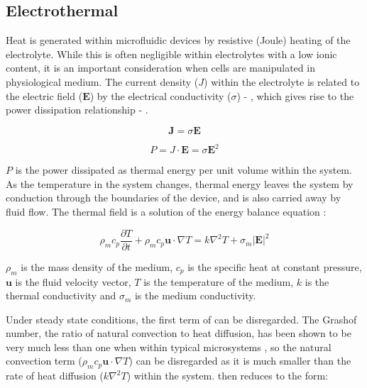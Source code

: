 \subsection{Electrothermal}

Heat is generated within microfluidic devices by resistive (Joule) heating of the electrolyte. While this is often negligible within electrolytes with a low ionic content, it is an important consideration when cells are manipulated in physiological medium. The current density ($J$) within the electrolyte is related to the electric field ($\textbf{E}$) by the electrical conductivity ($\sigma$) - , which gives rise to the power dissipation relationship - .

\begin{equation}
\textbf{J} = \sigma \textbf{E}
 \label{eqn:current_density}
\end{equation} 

\begin{equation}
P = J \cdot \textbf{E} = \sigma \textbf{E}^{2}
 \label{eqn:power_dissipation}
\end{equation} 

$P$ is the power dissipated as thermal energy per unit volume within the system. As the temperature in the system changes, thermal energy leaves the system by conduction through the boundaries of the device, and is also carried away by fluid flow. The thermal field is a solution of the energy balance equation \citep{Morgan:2003}:

\begin{equation}
 \rho_{m} c_{p} \frac{\partial T}{\partial t} + \rho_{m} c_{p} \textbf{u} \cdot \nabla T = k \nabla^{2} T + \sigma_{m} \left| \textbf{E} \right| ^{2}
\label{eqn:thermal_energy_balance}
\end{equation}

$ \rho_{m} $ is the mass density of the medium, $ c_{p} $ is the specific heat at constant pressure, $\textbf{u}$ is the fluid velocity vector, $ T $ is the temperature of the medium, $ k $ is the thermal conductivity and $\sigma_{m}$ is the medium conductivity.

Under steady state conditions, the first term of  can be disregarded. The Grashof number, the ratio of natural convection to heat diffusion, has been shown to be very much less than one when within typical microsystems \citep{Castellanos:1998}, so the natural convection term ($ \rho_{m} c_{p} \textbf{u} \cdot \nabla T $) can be disregarded as it is much smaller than the rate of heat diffusion ($ k \nabla^{2} T $) within the system.  then reduces to the form:

